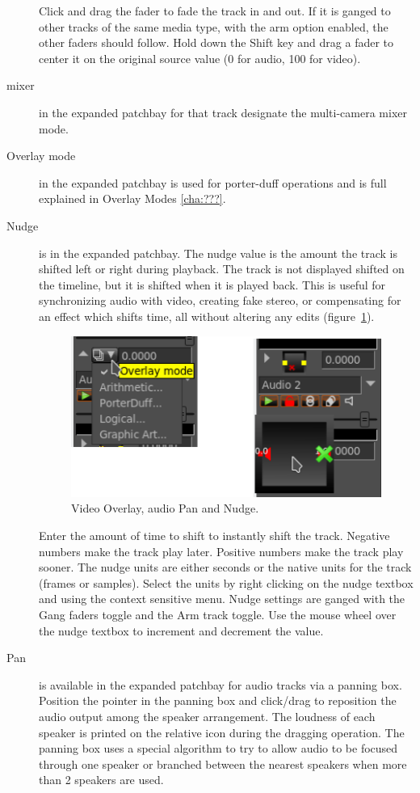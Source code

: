 \begin{description}
    Click and drag the fader to fade the track in and out.  If it is ganged to other tracks of the same media type, with the arm option enabled, the other faders should follow.  Hold down the Shift key and drag a fader to center it on the original source value (0 for audio, 100 for video).
    \item[mixer] in the expanded patchbay for that track designate the multi-camera mixer mode.
    \item[Overlay mode] in the expanded patchbay is used for porter-duff operations and is full explained in Overlay Modes \ref{cha:???}.
    \item[Nudge] is in the expanded patchbay.  The nudge value is the amount the track is shifted left or right during playback. The track is not displayed shifted on the timeline, but it is shifted when it is played back. This is useful for synchronizing audio with video, creating fake stereo, or compensating for an effect which shifts time, all without altering any edits (figure~\ref{fig:overlay}).
    
    \begin{figure}[htpb]
        \centering
        \includegraphics[width=0.7\linewidth]{images/overlay.png}
        \caption{Video Overlay, audio Pan and Nudge.}
        \label{fig:overlay}
    \end{figure}
    
    Enter the amount of time to shift to instantly shift the track. Negative numbers make the track play later. Positive numbers make the track play sooner. The nudge units are either seconds or the native units for the track (frames or samples). Select the units by right clicking on the nudge textbox and using the context sensitive menu. Nudge settings are ganged with the Gang faders toggle and the Arm track toggle. Use the mouse wheel over the nudge textbox to increment and decrement the value.
    \item[Pan] is available in the expanded patchbay for audio tracks via a panning box. Position the pointer in the panning box and click/drag to reposition the audio output among the speaker arrangement. The loudness of each speaker is printed on the relative icon during the dragging operation. The panning box uses a special algorithm to try to allow audio to be focused through one speaker or branched between the nearest speakers when more than 2 speakers are used.  
\end{description}

